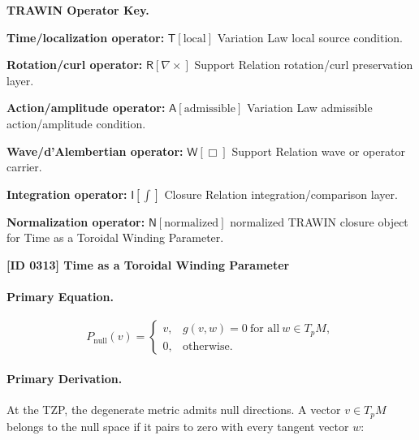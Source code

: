 \par\vspace{0.45\baselineskip}
\noindent\begin{minipage}[t]{\linewidth}
\begingroup
\small
\raggedright
\textbf{TRAWIN Operator Key.}\par
\noindent\textbf{Time/localization operator:} $\mathsf{T}\!\left[\mathrm{local}\right]$ Variation Law local source condition.\par
\noindent\textbf{Rotation/curl operator:} $\mathsf{R}\!\left[\nabla\times\right]$ Support Relation rotation/curl preservation layer.\par
\noindent\textbf{Action/amplitude operator:} $\mathsf{A}\!\left[\mathrm{admissible}\right]$ Variation Law admissible action/amplitude condition.\par
\noindent\textbf{Wave/d'Alembertian operator:} $\mathsf{W}\!\left[\Box\right]$ Support Relation wave or operator carrier.\par
\noindent\textbf{Integration operator:} $\mathsf{I}\!\left[\int\right]$ Closure Relation integration/comparison layer.\par
\noindent\textbf{Normalization operator:} $\mathsf{N}\!\left[\mathrm{normalized}\right]$ normalized TRAWIN closure object for Time as a Toroidal Winding Parameter.\par
\endgroup
\end{minipage}

\clearpage
\noindent\textbf{[ID 0313] Time as a Toroidal Winding Parameter}\par
\vspace{0.35em}
\paragraph{Primary Equation.}
\begin{equation}
P_{\mathrm{null}}(v)
=
\begin{cases}
v, & g(v,w)=0\ \text{for all}\ w\in T_pM,\\
0, & \text{otherwise}.
\end{cases}
\end{equation}

\paragraph{Primary Derivation.}
At the TZP, the degenerate metric admits null directions.  
A vector $v\in T_pM$ belongs to the null space if it pairs to zero with every tangent vector $w$:

